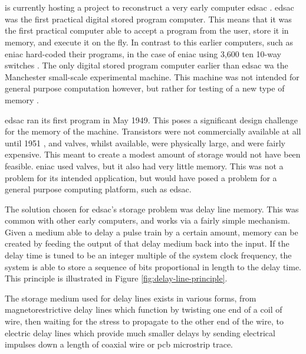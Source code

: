 
\chapter{} \label{sec:intro}
 is currently hosting a project to reconstruct a very early computer \gls{edsac} . \Gls{edsac} was the first practical digital stored program computer. This means that it was the first practical computer able to accept a program from the user, store it in memory, and execute it on the fly. In contrast to this earlier computers, such as \gls{eniac} hard-coded their programs, in the case of \gls{eniac} using 3,600 ten 10-way switches \cite{cruz2013}. The only digital stored program computer earlier than \gls{edsac} wa the Manchester small-scale experimental machine. This machine was not intended for general purpose computation however, but rather for testing of a new type of memory \cite{jones2001}.

\Gls{edsac} ran its first program in May 1949. This poses a significant design challenge for the memory of the machine. Transistors were not commercially available at all until 1951 \cite{bonne2007}, and valves, whilst available, were physically large, and were fairly expensive. This meant to create a modest amount of storage would not have been feasible. \Gls{eniac} used valves, but it also had very little memory. This was not a problem for its intended application, but would have posed a problem for a general purpose computing platform, such as \gls{edsac}\cite[p.208]{wilkes1948}.

The solution chosen for \gls{edsac}'s storage problem was delay line memory. This was common with other early computers, and works via a fairly simple mechanism. Given a medium able to delay a pulse train by a certain amount, memory can be created by feeding the output of that delay medium back into the input. If the delay time is tuned to be an integer multiple of the system clock frequency, the system is able to store a sequence of bits proportional in length to the delay time. This principle is illustrated in Figure \ref{fig:delay-line-principle}.

The storage medium used for delay lines exists in various forms, from magnetorestrictive delay lines which function by twisting one end of a coil of wire, then waiting for the stress to propagate to the other end of the wire, to electric delay lines which provide much smaller delays by sending electrical impulses down a length of coaxial wire or \gls{pcb} microstrip trace.

